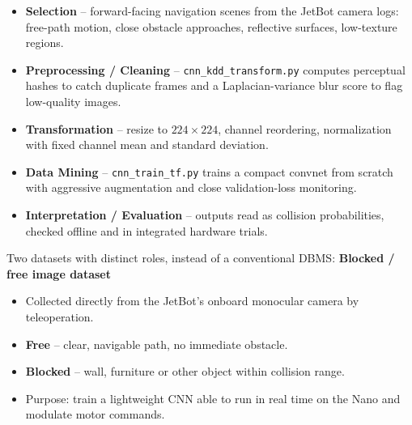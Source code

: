 {
	\begin{itemize}
		\item \textbf{Selection} -- forward-facing navigation scenes from the JetBot camera logs: free-path motion, close obstacle approaches, reflective surfaces, low-texture regions.
		\item \textbf{Preprocessing / Cleaning} -- \texttt{cnn\_kdd\_transform.py} computes perceptual hashes to catch duplicate frames and a Laplacian-variance blur score to flag low-quality images.
		\item \textbf{Transformation} -- resize to $224\times224$, channel reordering, normalization with fixed channel mean and standard deviation.
		\item \textbf{Data Mining} -- \texttt{cnn\_train\_tf.py} trains a compact convnet from scratch with aggressive augmentation and close validation-loss monitoring.
		\item \textbf{Interpretation / Evaluation} -- outputs read as collision probabilities, checked offline and in integrated hardware trials.
	\end{itemize}
	\vspace{0.3em}

}

{
	Two datasets with distinct roles, instead of a conventional DBMS:
	\vspace{0.4em}
	\textbf{Blocked / free image dataset}
	\begin{itemize}
		\item Collected directly from the JetBot's onboard monocular camera by teleoperation.
		\item \textbf{Free} -- clear, navigable path, no immediate obstacle.
		\item \textbf{Blocked} -- wall, furniture or other object within collision range.
		\item Purpose: train a lightweight CNN able to run in real time on the Nano and modulate motor commands.
	\end{itemize}
}


